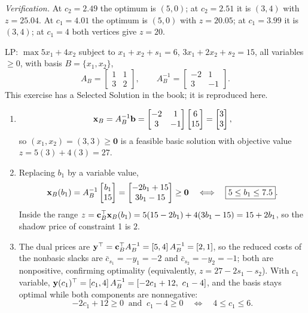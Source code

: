 \emph{Verification.} At $c_2 = 2.49$ the optimum is $(5,0)$; at $c_2 = 2.51$ it is $(3,4)$ with $z = 25.04$. At $c_1 = 4.01$ the optimum is $(5,0)$ with $z = 20.05$; at $c_1 = 3.99$ it is $(3,4)$; at $c_1 = 4$ both vertices give $z = 20$.


LP: $\max 5x_1 + 4x_2$ subject to $x_1 + x_2 + s_1 = 6$, $3x_1 + 2x_2 + s_2 = 15$, all variables $\ge 0$, with basis $B = \{x_1, x_2\}$,
\[
A_B = \begin{bmatrix} 1 & 1 \\ 3 & 2 \end{bmatrix}, \qquad
A_B^{-1} = \begin{bmatrix} -2 & 1 \\ 3 & -1 \end{bmatrix}.
\]
This exercise has a Selected Solution in the book; it is reproduced here.

\begin{enumerate}
\item
\[
\mathbf{x}_B = A_B^{-1}\mathbf{b} = \begin{bmatrix} -2 & 1 \\ 3 & -1 \end{bmatrix}\begin{bmatrix} 6 \\ 15 \end{bmatrix} = \begin{bmatrix} 3 \\ 3 \end{bmatrix},
\]
so $(x_1, x_2) = (3, 3) \geq \mathbf{0}$ is a feasible basic solution with objective value $z = 5(3) + 4(3) = 27$.
\item Replacing $b_1$ by a variable value,
\[
\mathbf{x}_B(b_1) = A_B^{-1}\begin{bmatrix} b_1 \\ 15 \end{bmatrix} = \begin{bmatrix} -2b_1 + 15 \\ 3b_1 - 15 \end{bmatrix} \geq \mathbf{0}
\quad\Longleftrightarrow\quad \boxed{5 \le b_1 \le 7.5}.
\]
Inside the range $z = \mathbf{c}_B^\top \mathbf{x}_B(b_1) = 5(15 - 2b_1) + 4(3b_1 - 15) = 15 + 2b_1$, so the shadow price of constraint 1 is $2$.
\item The dual prices are $\mathbf{y}^\top = \mathbf{c}_B^\top A_B^{-1} = [5, 4]\, A_B^{-1} = [2, 1]$, so the reduced costs of the nonbasic slacks are $\bar{c}_{s_1} = -y_1 = -2$ and $\bar{c}_{s_2} = -y_2 = -1$; both are nonpositive, confirming optimality (equivalently, $z = 27 - 2s_1 - s_2$). With $c_1$ variable, $\mathbf{y}(c_1)^\top = [c_1, 4]\, A_B^{-1} = [-2c_1 + 12,\ c_1 - 4]$, and the basis stays optimal while both components are nonnegative:
\[
-2c_1 + 12 \ge 0 \ \text{ and } \ c_1 - 4 \ge 0
\quad\Longleftrightarrow\quad \boxed{4 \le c_1 \le 6}.
\]
\end{enumerate}

